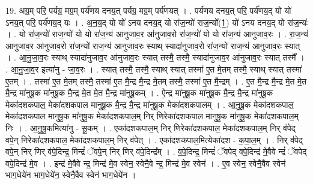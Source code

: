 \documentclass[17pt]{extarticle}
\begin{document}
19. अग्र॒म् परि॒ पर्यग्र॒ मग्र॒म् पर्य॑णय दनय॒त् पर्यग्र॒ मग्र॒म् पर्य॑णयत् । . पर्य॑णय दनय॒त् परि॒ पर्य॑णय॒द् यो यो॑ ऽनय॒त् परि॒ पर्य॑णय॒द् यः । . अ॒न॒य॒द् यो यो॑ ऽनय दनय॒द् यो रा॑ज॒न्यो॑ राज॒न्यो᳚(1॒) यो॑ ऽनय दनय॒द् यो रा॑ज॒न्यः॑ । . यो रा॑ज॒न्यो॑ राज॒न्यो॑ यो यो रा॑ज॒न्य॑ आनुजाव॒र आ॑नुजाव॒रो रा॑ज॒न्यो॑ यो यो रा॑ज॒न्य॑ आनुजाव॒रः । . रा॒ज॒न्य॑ आनुजाव॒र आ॑नुजाव॒रो रा॑ज॒न्यो॑ राज॒न्य॑ आनुजाव॒रः स्याथ् स्यादा॑नुजाव॒रो रा॑ज॒न्यो॑ राज॒न्य॑ आनुजाव॒रः स्यात् । . आ॒नु॒जा॒व॒रः स्याथ् स्यादा॑नुजाव॒र आ॑नुजाव॒रः स्यात् तस्मै॒ तस्मै॒ स्यादा॑नुजाव॒र आ॑नुजाव॒रः स्यात् तस्मै᳚ । . आ॒नु॒जा॒व॒र इत्या॑नु - जा॒व॒रः । . स्यात् तस्मै॒ तस्मै॒ स्याथ् स्यात् तस्मा॑ ए॒त मे॒तम् तस्मै॒ स्याथ् स्यात् तस्मा॑ ए॒तम् । . तस्मा॑ ए॒त मे॒तम् तस्मै॒ तस्मा॑ ए॒त मै॒न्द्र मै॒न्द्र मे॒तम् तस्मै॒ तस्मा॑ ए॒त मै॒न्द्रम् । . ए॒त मै॒न्द्र मै॒न्द्र मे॒त मे॒त मै॒न्द्र मा॑नुषू॒क मा॑नुषू॒क मै॒न्द्र मे॒त मे॒त मै॒न्द्र मा॑नुषू॒कम् । . ऐ॒न्द्र मा॑नुषू॒क मा॑नुषू॒क मै॒न्द्र मै॒न्द्र मा॑नुषू॒क मेका॑दशकपाल॒ मेका॑दशकपाल मानुषू॒क मै॒न्द्र मै॒न्द्र मा॑नुषू॒क मेका॑दशकपालम् । . आ॒नु॒षू॒क मेका॑दशकपाल॒ मेका॑दशकपाल मानुषू॒क मा॑नुषू॒क मेका॑दशकपाल॒म् निर् णिरेका॑दशकपाल मानुषू॒क मा॑नुषू॒क मेका॑दशकपाल॒म् निः । . आ॒नु॒षू॒कमित्या॑नु - सू॒कम् । . एका॑दशकपाल॒म् निर् णिरेका॑दशकपाल॒ मेका॑दशकपाल॒म् निर् व॑पेद् वपे॒न् निरेका॑दशकपाल॒ मेका॑दशकपाल॒म् निर् व॑पेत् । . एका॑दशकपाल॒मित्येका॑दश - क॒पा॒ल॒म् । . निर् व॑पेद् वपे॒न् निर् णिर् व॑पे॒दिन्द्र॒ मिन्द्रं॑ ॅवपे॒न् निर् णिर् व॑पे॒दिन्द्र᳚म् । . व॒पे॒दिन्द्र॒ मिन्द्रं॑ ॅवपेद् वपे॒दिन्द्र॑ मे॒वैवे न्द्रं॑ ॅवपेद् वपे॒दिन्द्र॑ मे॒व । . इन्द्र॑ मे॒वैवे न्द्र॒ मिन्द्र॑ मे॒व स्वेन॒ स्वेनै॒वे न्द्र॒ मिन्द्र॑ मे॒व स्वेन॑ । . ए॒व स्वेन॒ स्वेनै॒वैव स्वेन॑ भाग॒धेये॑न भाग॒धेये॑न॒ स्वेनै॒वैव स्वेन॑ भाग॒धेये॑न । \newline
\end{document}

